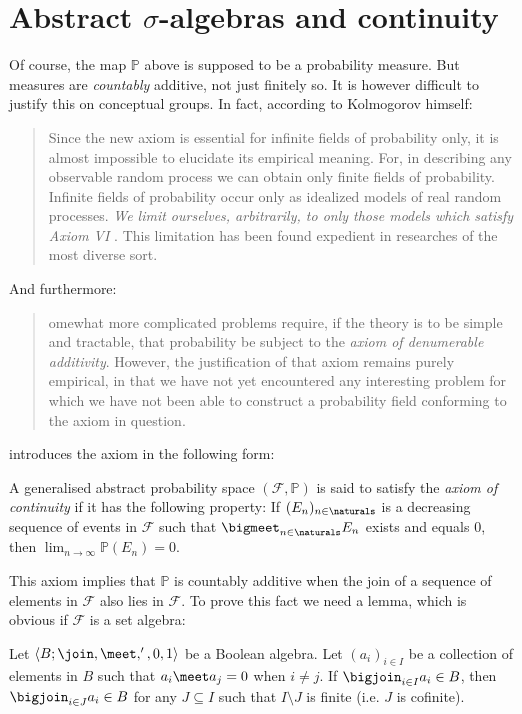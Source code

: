 \documentclass[article, a4paper, 11pt, oneside]{memoir}
\numberwithin{equation}{chapter}
\newcommand{\calF}{\mathcal{F}}
\renewcommand{\P}{\mathbb{P}}
\begin{document}
\chapter[Abstract sigma-algebras and continuity][Abstract $\sigma$-algebras and continuity]{Abstract $\sigma$-algebras and continuity}

Of course, the map $\P$ above is supposed to be a probability measure. But measures are \emph{countably} additive, not just finitely so. It is however difficult to justify this on conceptual groups. In fact, according to Kolmogorov himself:
%
\blockquote[\cite{kolmogorov1956}]{%
    Since the new axiom  is essential for infinite fields of probability only, it is almost impossible to elucidate its empirical meaning. \textelp{} For, in describing any observable random process we can obtain only finite fields of probability. Infinite fields of probability occur only as idealized models of real random processes. \emph{We limit ourselves, arbitrarily, to only those models which satisfy Axiom VI} . This limitation has been found expedient in researches of the most diverse sort.%
}
%
And furthermore:
%
\blockquote[\cite{kolmogorov1995}]{%
    omewhat more complicated problems require, if the theory is to be simple and tractable, that probability be subject to the \emph{axiom of denumerable additivity}. However, the justification of that axiom remains purely empirical, in that we have not yet encountered any interesting problem for which we have not been able to construct a probability field conforming to the axiom in question.%
}
%
\textcite{kolmogorov1956} introduces the axiom in the following form:

\begin{definition}
    A generalised abstract probability space $(\calF, \P)$ is said to satisfy the \emph{axiom of continuity} if it has the following property: If $(E_n)_{n\in\naturals}$ is a decreasing sequence of events in $\calF$ such that $\bigmeet_{n\in\naturals} E_n$ exists and equals $0$, then $\lim_{n\to\infty} \P(E_n) = 0$.
\end{definition}
%
This axiom implies that $\P$ is countably additive when the join of a sequence of elements in $\calF$ also lies in $\calF$. To prove this fact we need a lemma, which is obvious if $\calF$ is a set algebra:

\begin{lemma}
    \label{thm:refine_join}
    Let $\langle B; \join, \meet, ', 0, 1 \rangle$ be a Boolean algebra. Let $(a_i)_{i \in I}$ be a collection of elements in $B$ such that $a_i \meet a_j = 0$ when $i \neq j$. If $\bigjoin_{i \in I} a_i \in B$, then $\bigjoin_{i \in J} a_i \in B$ for any $J \subseteq I$ such that $I \setminus J$ is finite (i.e. $J$ is cofinite).
\end{lemma}
\end{document}
